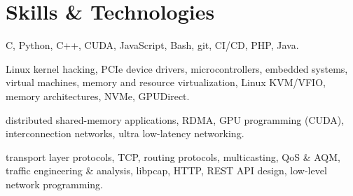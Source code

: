 \section{Skills \& Technologies}
{C, Python, C++, CUDA, JavaScript, Bash, git, CI/CD, PHP, Java.}

{Linux kernel hacking, PCIe device drivers, microcontrollers, embedded systems, virtual machines, memory and resource virtualization, Linux KVM/VFIO, memory architectures, NVMe, GPUDirect.}

{distributed shared-memory applications, RDMA, GPU programming (CUDA), interconnection networks, ultra low-latency networking.}

{transport layer protocols, TCP, routing protocols, multicasting, QoS \& AQM, traffic engineering \& analysis, libpcap, HTTP, REST API design, low-level network programming.}

%
%
%
%
